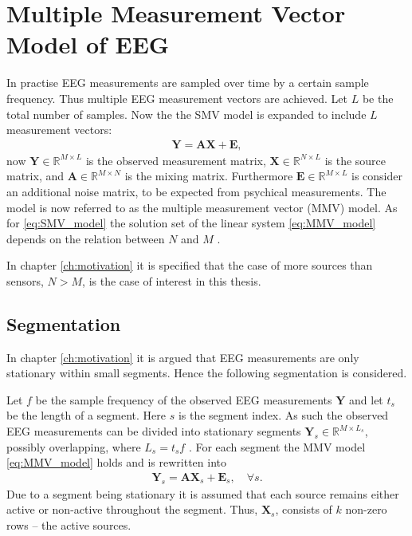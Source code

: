 \section{Multiple Measurement Vector Model of EEG}\label{sec:MMV}
In practise EEG measurements are sampled over time by a certain sample frequency. 
Thus multiple EEG measurement vectors are achieved.
Let $L$ be the total number of samples. Now the  
the SMV model is expanded to include $L$ measurement vectors:
\begin{align}\label{eq:MMV_model}
\mathbf{Y} = \mathbf{AX}+\textbf{E},
\end{align}
now $\mathbf{Y} \in \mathbb{R}^{M \times L}$ is the observed measurement matrix, $\mathbf{X} \in \mathbb{R}^{N \times L}$ is the source matrix, and $\mathbf{A} \in \mathbb{R}^{M \times N}$ is the mixing matrix. 
Furthermore $\textbf{E} \in \mathbb{R}^{M \times L}$ is consider an additional noise matrix, to be expected from psychical measurements.  
The model is now referred to as the multiple measurement vector (MMV) model.
As for \eqref{eq:SMV_model} the solution set of the linear system \eqref{eq:MMV_model} depends on the relation between $N$ and $M$ \cite[p. 42]{CS}. 

In chapter \ref{ch:motivation} it is specified that the case of more sources than sensors, $N>M$, is the case of interest in this thesis.  

\subsection{Segmentation}
In chapter \ref{ch:motivation} it is argued that EEG measurements are only stationary within small segments. 
Hence the following segmentation is considered.

Let $f$ be the sample frequency of the observed EEG measurements $\mathbf{Y}$ and let $t_s$ be the length of a segment. 
Here $s$ is the segment index. 
As such the observed EEG measurements can be divided into stationary segments  $\mathbf{Y}_s \in \mathbb{R}^{M \times L_{s}}$, possibly overlapping, where $L_s = t_{s}f$ . 
For each segment the MMV model \eqref{eq:MMV_model} holds and is rewritten into
\begin{align}\label{eq:MMV_seg}
\mathbf{Y}_s = \mathbf{AX}_s + \textbf{E}_s, \quad \forall s.
\end{align}
Due to a segment being stationary it is assumed that each source remains either active or non-active throughout the segment.
Thus, $\mathbf{X}_s$, consists of $k$ non-zero rows -- the active sources.

